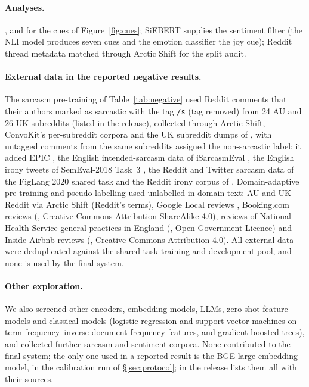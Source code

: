 \documentclass[11pt]{article}
\begin{document}
\paragraph{Analyses.}  \citep{laurer2023zeroshot},
 \citep{hartmann2023siebert} and
 \citep{hartmann2022emotion} for the cues of Figure~\ref{fig:cues};
SiEBERT supplies the sentiment filter (the NLI model produces seven cues and the
emotion classifier the joy cue); Reddit thread metadata matched through Arctic Shift \citep{arcticshift} for the split audit.

\paragraph{External data in the reported negative results.} The sarcasm pre-training of Table~\ref{tab:negative}
used Reddit comments that their authors marked as sarcastic with the tag \texttt{/s} (tag removed) from 24 AU and 26 UK
subreddits (listed in the release), collected through Arctic
Shift, ConvoKit's per-subreddit corpora \citep{chang-etal-2020-convokit} and the UK subreddit dumps of
\citet{redditusuk}, with untagged comments from the same subreddits assigned the non-sarcastic label; it added EPIC \citep{frenda-etal-2023-epic},
the English intended-sarcasm data of iSarcasmEval \citep{abu-farha-etal-2022-semeval}, the English irony tweets of SemEval-2018 Task~3 \citep{van-hee-etal-2018-semeval}, the Reddit and Twitter sarcasm data of the FigLang 2020 shared task
\citep{ghosh-etal-2020-report} and the Reddit irony corpus of \citet{wallace-etal-2014-humans}. Domain-adaptive pre-training and pseudo-labelling used
unlabelled in-domain text: AU and UK Reddit via Arctic Shift (Reddit's terms), Google Local reviews
\citep{he2017translation,pasricha2018translation}, Booking.com reviews (, Creative Commons
Attribution-ShareAlike 4.0), reviews of National Health Service general practices in England
(, Open Government Licence) and Inside Airbnb
reviews (, Creative Commons Attribution 4.0). All external data were deduplicated against the shared-task training and development pool, and none is used by
the final system.

\paragraph{Other exploration.} We also screened other encoders, embedding models, LLMs, zero-shot feature models and
classical models (logistic regression and support vector machines on term-frequency--inverse-document-frequency
features, and gradient-boosted trees), and collected further sarcasm and sentiment corpora. None contributed to the
final system; the only one used in a reported result is the BGE-large embedding model, in the calibration run of
\S\ref{sec:protocol};  in the release lists them all with their sources.
\end{document}
